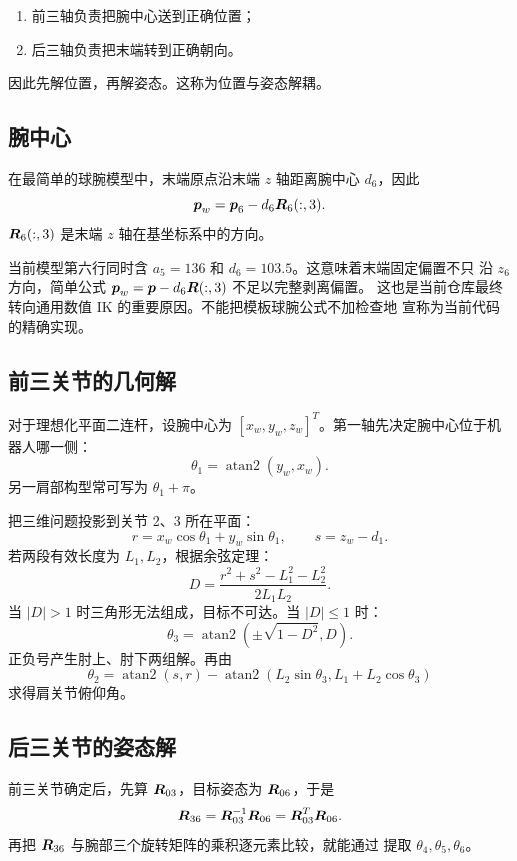 \begin{enumerate}
  \item 前三轴负责把腕中心送到正确位置；
  \item 后三轴负责把末端转到正确朝向。
\end{enumerate}

因此先解位置，再解姿态。这称为位置与姿态解耦。

\subsection{腕中心}

在最简单的球腕模型中，末端原点沿末端 $z$ 轴距离腕中心 $d_6$，因此
\[
\boldsymbol{p}_w=\boldsymbol{p}_6-d_6\boldsymbol{R}_6(:,3).
\]
$\boldsymbol{R}_6(:,3)$ 是末端 $z$ 轴在基坐标系中的方向。

\begin{dangerbox}[当前 SR3 参数并非最简单模板]
当前模型第六行同时含 $a_5=136$ 和 $d_6=103.5$。这意味着末端固定偏置不只
沿 $z_6$ 方向，简单公式 $\boldsymbol{p}_w=\boldsymbol{p}-d_6\boldsymbol{R}(:,3)$ 不足以完整剥离偏置。
这也是当前仓库最终转向通用数值 IK 的重要原因。不能把模板球腕公式不加检查地
宣称为当前代码的精确实现。
\end{dangerbox}

\subsection{前三关节的几何解}

对于理想化平面二连杆，设腕中心为
$[x_w,y_w,z_w]^T$。第一轴先决定腕中心位于机器人哪一侧：
\[
\theta_1=\operatorname{atan2}(y_w,x_w).
\]
另一肩部构型常可写为 $\theta_1+\pi$。

把三维问题投影到关节 2、3 所在平面：
\[
r=x_w\cos\theta_1+y_w\sin\theta_1,\qquad
s=z_w-d_1.
\]
若两段有效长度为 $L_1,L_2$，根据余弦定理：
\[
D=\frac{r^2+s^2-L_1^2-L_2^2}{2L_1L_2}.
\]
当 $|D|>1$ 时三角形无法组成，目标不可达。当 $|D|\le1$ 时：
\[
\theta_3=
\operatorname{atan2}\left(\pm\sqrt{1-D^2},D\right).
\]
正负号产生肘上、肘下两组解。再由
\[
\theta_2=
\operatorname{atan2}(s,r)
-\operatorname{atan2}
\left(L_2\sin\theta_3,L_1+L_2\cos\theta_3\right)
\]
求得肩关节俯仰角。

\subsection{后三关节的姿态解}

前三关节确定后，先算 $\boldsymbol{R}_{03}$，目标姿态为 $\boldsymbol{R}_{06}$，于是
\[
\boldsymbol{R}_{36}=\boldsymbol{R}_{03}^{-1}\boldsymbol{R}_{06}=\boldsymbol{R}_{03}^{T}\boldsymbol{R}_{06}.
\]
再把 $\boldsymbol{R}_{36}$ 与腕部三个旋转矩阵的乘积逐元素比较，就能通过
 提取 $\theta_4,\theta_5,\theta_6$。

